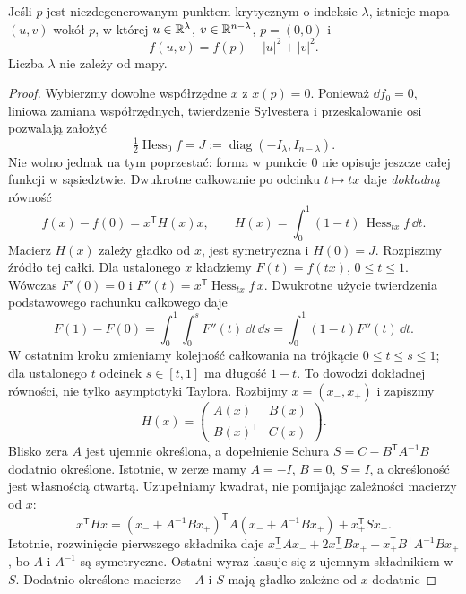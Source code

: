 \begin{twierdzenie}
\label{thm:lemat-morsea-17}
Jeśli $p$ jest niezdegenerowanym punktem
krytycznym o indeksie $\lambda$, istnieje
mapa $(u,v)$ wokół $p$, w której
$u\in\mathbb{R}^\lambda$, $v\in\mathbb{R}^{n-\lambda}$,
$p=(0,0)$ i
\begin{equation}\label{eq:postac-morsea-17}
 f(u,v)=f(p)-|u|^2+|v|^2.
\end{equation}
Liczba $\lambda$ nie zależy od mapy.
\end{twierdzenie}
\begin{proof}
Wybierzmy dowolne współrzędne $x$ z $x(p)=0$.
Ponieważ $\dd f_0=0$, liniowa zamiana
współrzędnych, twierdzenie Sylvestera
i przeskalowanie osi pozwalają założyć
\[
 \tfrac12\operatorname{Hess}_0f
  =J:=\operatorname{diag}(-I_\lambda,I_{n-\lambda}).
\]
Nie wolno jednak na tym poprzestać:
forma w punkcie $0$ nie opisuje jeszcze
całej funkcji w sąsiedztwie.
Dwukrotne całkowanie po odcinku
$t\mapsto tx$ daje \emph{dokładną} równość
\[
 f(x)-f(0)
  =x^{\mathsf T}H(x)x,\qquad
 H(x)=\int_0^1(1-t)\,
                    \operatorname{Hess}_{tx}f\,\dd t.
\]
Macierz $H(x)$ zależy gładko od $x$,
jest symetryczna i $H(0)=J$.
Rozpiszmy źródło tej całki. Dla ustalonego $x$ kładziemy
$F(t)=f(tx)$, $0\leq t\leq1$. Wówczas $F'(0)=0$ i
$F''(t)=x^{\mathsf T}\operatorname{Hess}_{tx}f\,x$.
Dwukrotne użycie twierdzenia podstawowego rachunku całkowego daje
\[
 F(1)-F(0)
 =\int_0^1\int_0^s F''(t)\,\dd t\,\dd s
 =\int_0^1(1-t)F''(t)\,\dd t.
\]
W ostatnim kroku zmieniamy kolejność całkowania
na trójkącie $0\leq t\leq s\leq1$; dla ustalonego $t$
odcinek $s\in[t,1]$ ma długość $1-t$.
To dowodzi dokładnej równości, nie tylko asymptotyki Taylora.
Rozbijmy $x=(x_-,x_+)$ i zapiszmy
\[
 H(x)=
 \begin{pmatrix} A(x)&B(x)\\
                 B(x)^{\mathsf T}&C(x)\end{pmatrix}.
\]
Blisko zera $A$ jest ujemnie określona,
a dopełnienie Schura
$S=C-B^{\mathsf T}A^{-1}B$ dodatnio
określone. Istotnie, w zerze mamy
$A=-I$, $B=0$, $S=I$, a określoność
jest własnością otwartą.
Uzupełniamy kwadrat, nie pomijając
zależności macierzy od $x$:
\[
 x^{\mathsf T}Hx
 =(x_-+A^{-1}Bx_+)^{\mathsf T}
       A(x_-+A^{-1}Bx_+)
   +x_+^{\mathsf T}Sx_+.
\]
Istotnie, rozwinięcie pierwszego składnika daje
$x_-^{\mathsf T}Ax_-+2x_-^{\mathsf T}Bx_+
+x_+^{\mathsf T}B^{\mathsf T}A^{-1}Bx_+$,
bo $A$ i $A^{-1}$ są symetryczne.
Ostatni wyraz kasuje się z ujemnym składnikiem w $S$.
Dodatnio określone macierze $-A$ i $S$
mają gładko zależne od $x$ dodatnie

\end{proof}
